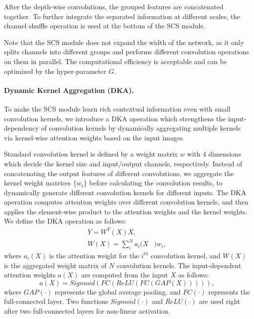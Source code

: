 \documentclass{article}
\begin{document}
After the depth-wise convolutions, the grouped features are concatenated together. To further integrate the separated information at different scales, the channel shuffle operation \cite{ma:shuffle2} is used at the bottom of the SCS module. 

Note that the SCS module does not expand the width of the network, as it only splits channels into different groups and performs different convolution operations on them in parallel. The computational efficiency is acceptable and can be optimized by the hyper-parameter $G$.

\paragraph{Dynamic Kernel Aggregation (DKA).} To make the SCS module learn rich contextual information even with small convolution kernels, we introduce a DKA operation which strengthens the input-dependency of convolution kernels by dynamically aggregating multiple kernels via kernel-wise attention weights based on the input images.

Standard convolution kernel is defined by a weight matrix $w$ with $4$ dimensions which decide the kernel size and input/output channels, respectively. Instead of concatenating the output features of different convolutions, we aggregate the kernel weight matrices $\{w_i\}$ before calculating the convolution results, to dynamically generate different convolution kernels for different inputs. The DKA operation computes attention weights over different convolution kernels, and then applies the element-wise product to the attention weights and the kernel weights. We define the DKA operation as follows:
\begin{equation}
    \begin{split}
        Y = W^T(X)X, &\\
        W(X) = \sum^{N}_{i}a_i(X & )w_i,
    \end{split}
\end{equation}where $a_i(X)$ is the attention weight for the $i^{th}$ convolution kernel, and $W(X)$ is the aggregated weight matrix of $N$ convolution kernels. The input-dependent attention weights $a(X)$ are computed from the input $X$ as follows:
\begin{equation}
    a(X) = Sigmoid(FC(ReLU(FC(GAP(X))))),
\end{equation}where $GAP(\cdot)$ represents the global average pooling, and $FC(\cdot)$ represents the full-connected layer. Two functions $Sigmoid(\cdot)$ and $ReLU(\cdot)$ are used right after two full-connected layers for non-linear activation.
\end{document}
